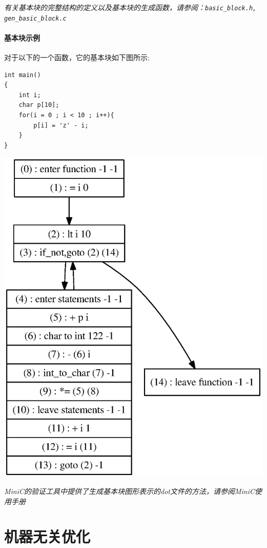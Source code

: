 {\it \anchor 有关基本块的完整结构的定义以及基本块的生成函数，请参阅：\verb|basic_block.h, gen_basic_block.c|}\\
\paragraph*{基本块示例}

对于以下的一个函数，它的基本块如下图所示:
\begin{lstlisting}
int main()
{
	int i;
	char p[10];
	for(i = 0 ; i < 10 ; i++){
		p[i] = 'z' - i;
	}
}
\end{lstlisting}
\begin{center}
	\includegraphics[scale=0.5]{basic_block}
\end{center}
{\it \manerrarrow MiniC的验证工具中提供了生成基本块图形表示的dot文件的方法，请参阅MiniC使用手册}\\
\section{机器无关优化}
\label{indepopt}

